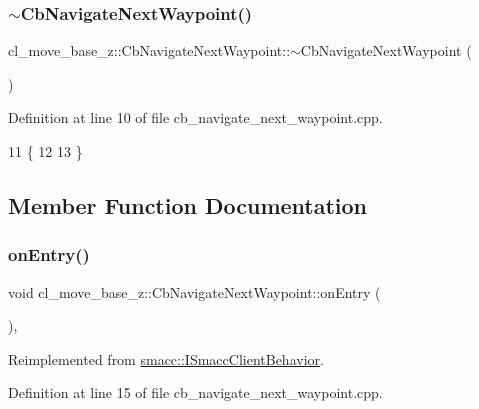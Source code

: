 \subsubsection{\texorpdfstring{$\sim$\+Cb\+Navigate\+Next\+Waypoint()}{~CbNavigateNextWaypoint()}}
{\footnotesize\ttfamily cl\+\_\+move\+\_\+base\+\_\+z\+::\+Cb\+Navigate\+Next\+Waypoint\+::$\sim$\+Cb\+Navigate\+Next\+Waypoint (\begin{DoxyParamCaption}{ }\end{DoxyParamCaption})\hspace{0.3cm}{\ttfamily [virtual]}}



Definition at line 10 of file cb\+\_\+navigate\+\_\+next\+\_\+waypoint.\+cpp.


\begin{DoxyCode}
11     \{
12 
13     \}
\end{DoxyCode}


\subsection{Member Function Documentation}
\mbox{\label{classcl__move__base__z_1_1CbNavigateNextWaypoint_a04913ef24344363669c1916b5df28493}} 
\subsubsection{\texorpdfstring{on\+Entry()}{onEntry()}}
{\footnotesize\ttfamily void cl\+\_\+move\+\_\+base\+\_\+z\+::\+Cb\+Navigate\+Next\+Waypoint\+::on\+Entry (\begin{DoxyParamCaption}{ }\end{DoxyParamCaption})\hspace{0.3cm}{\ttfamily [override]}, {\ttfamily [virtual]}}



Reimplemented from \hyperlink{classsmacc_1_1ISmaccClientBehavior_a9877684b1954429719826e2d0924d980}{smacc\+::\+I\+Smacc\+Client\+Behavior}.



Definition at line 15 of file cb\+\_\+navigate\+\_\+next\+\_\+waypoint.\+cpp.



